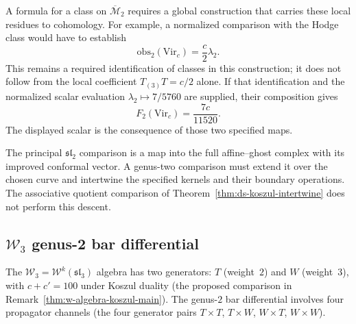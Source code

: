 \begin{remark}
\label{cor:virasoro-genus2-curvature}
A formula for a class on $\overline{\mathcal M}_2$ requires a global construction that carries these local residues to cohomology.
For example, a normalized comparison with the Hodge class would have to establish
\begin{equation}\label{eq:vir-obs2}
 \mathrm{obs}_2(\mathrm{Vir}_c)=\frac c2\lambda_2.
\end{equation}
This remains a required identification of classes in this construction; it does not follow from the local coefficient $T_{(3)}T=c/2$ alone.
If that identification and the normalized scalar evaluation $\lambda_2\mapsto7/5760$ are supplied, their composition gives
\begin{equation}\label{eq:vir-F2}
 F_2(\mathrm{Vir}_c)=\frac{7c}{11520}.
\end{equation}
The displayed scalar is the consequence of those two specified maps.
\end{remark}

\begin{remark}
\label{rem:virasoro-genus2-ds}
The principal $\mathfrak{sl}_2$ comparison is a map into the full affine--ghost complex with its improved conformal vector.
A genus-two comparison must extend it over the chosen curve and intertwine the specified kernels and their boundary operations.
The associative quotient comparison of Theorem~\ref{thm:ds-koszul-intertwine} does not perform this descent.
\end{remark}

\subsection{\texorpdfstring{$\mathcal{W}_3$ genus-2 bar differential}{W3 genus-2 bar differential}}
\label{subsec:w3-genus2-bar}

The $\mathcal{W}_3 = \mathcal{W}^k(\mathfrak{sl}_3)$ algebra has
two generators: $T$ (weight~$2$) and $W$ (weight~$3$), with
$c + c' = 100$ under Koszul duality
(the proposed comparison in Remark~\ref{thm:w-algebra-koszul-main}).  The genus-$2$ bar
differential involves four propagator channels (the four
generator pairs $T \times T$, $T \times W$, $W \times T$,
$W \times W$).

